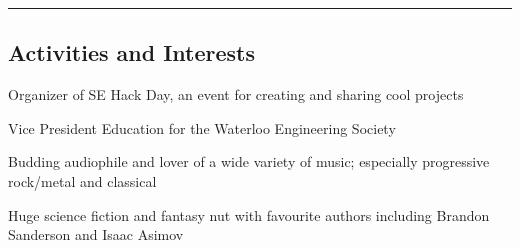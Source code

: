 \documentclass[10pt,letterpaper]{article}
\begin{document}
\hrule
\vspace{-0.4em}
\subsection*{Activities and Interests}

\begin{itemize*}
\item Organizer of SE Hack Day, an event for creating and sharing cool projects
\item Vice President Education for the Waterloo Engineering Society
\item Budding audiophile and lover of a wide variety of music; especially progressive rock/metal and classical
\item Huge science fiction and fantasy nut with favourite authors including Brandon Sanderson and Isaac Asimov
\end{itemize*}
\end{document}

